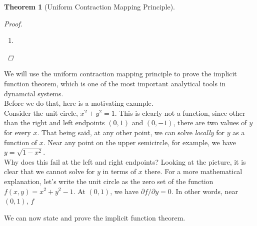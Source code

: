 \documentclass{article}
\newtheorem{theorem}{Theorem}[section]
\begin{document}
\begin{theorem}[Uniform Contraction Mapping Principle]
\begin{proof}
\begin{enumerate}
By the Uniform Contraction Mapping Principle, for each $\mu \in D$ there a unique fixed point $Z(\mu)$ of $\Phi$. Since $F$ is $C^1$, $\Phi$ is continuous, thus the map $Z(\mu)$ is continuous.\\

The only thing that remains is to show that $DG(\mu)$ exists and is equal to $Z(\mu)$. This is rather technical, so it will be omitted for now. (References will be provided at some point.)

\item 

\end{enumerate}

\end{proof}
\end{theorem}

We will use the uniform contraction mapping principle to prove the implicit function theorem, which is one of the most important analytical tools in dynamcial systems.\\

Before we do that, here is a motivating example.\\

Consider the unit circle, $x^2 + y^2 = 1$. This is clearly not a function, since other than the right and left endpoints $(0, 1)$ and $(0, -1)$, there are two values of $y$ for every $x$. That being said, at any other point, we can solve \emph{locally} for $y$ as a function of $x$. Near any point on the upper semicircle, for example, we have $y = \sqrt{1 - x^2}$. \\

Why does this fail at the left and right endpoints? Looking at the picture, it is clear that we cannot solve for $y$ in terms of $x$ there. For a more mathematical explanation, let's write the unit circle as the zero set of the function $f(x, y) = x^2 + y^2 - 1$. At $(0, 1)$, we have $\partial f / \partial y = 0$. In other words, near $(0, 1)$, $f$

We can now state and prove the implicit function theorem.
\end{document}
